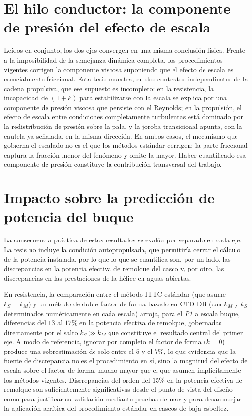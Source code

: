 \section{El hilo conductor: la componente de presión del efecto de escala}

Leídos en conjunto, los dos ejes convergen en una misma conclusión física. Frente a
la imposibilidad de la semejanza dinámica completa, los procedimientos vigentes
corrigen la componente viscosa suponiendo que el efecto de escala es esencialmente
friccional. Esta tesis muestra, en dos contextos independientes de la cadena
propulsiva, que ese supuesto es incompleto: en la resistencia, la incapacidad de
$(1+k)$ para estabilizarse con la escala se explica por una componente de presión
viscosa que persiste con el Reynolds; en la propulsión, el efecto de escala entre
condiciones completamente turbulentas está dominado por la redistribución de presión
sobre la pala, y la joroba transicional apunta, con la cautela ya señalada, en la
misma dirección. En ambos casos, el mecanismo que gobierna el escalado no es el que
los métodos estándar corrigen: la parte friccional captura la fracción menor del
fenómeno y omite la mayor. Haber cuantificado esa componente de presión constituye la
contribución transversal del trabajo.

\section{Impacto sobre la predicción de potencia del buque}

La consecuencia práctica de estos resultados se evalúa por separado en cada eje. La
tesis no incluye la condición autopropulsada, que permitiría cerrar el cálculo de la
potencia instalada, por lo que lo que se cuantifica son, por un lado, las
discrepancias en la potencia efectiva de remolque del casco y, por otro, las
discrepancias en las prestaciones de la hélice en aguas abiertas.

En resistencia, la comparación entre el método ITTC estándar (que asume $k_S = k_M$)
y un método de doble factor de forma basado en CFD DB (con $k_M$ y $k_S$
determinados numéricamente en cada escala) arroja, para el \textit{P1} a escala
buque, diferencias del $13$ al $17\%$ en la potencia efectiva de remolque,
gobernadas directamente por el salto $k_S \gg k_M$ que constituye el resultado
central del primer eje. A modo de referencia, ignorar por completo el factor de
forma ($k = 0$) produce una sobrestimación de solo entre el $5$ y el $7\%$, lo que
evidencia que la fuente de discrepancia no es el procedimiento en sí, sino la
magnitud del efecto de escala sobre el factor de forma, mucho mayor que el que asumen
implícitamente los métodos vigentes. Discrepancias del orden del $15\%$ en la
potencia efectiva de remolque son suficientemente significativas desde el punto de
vista del diseño como para justificar su validación mediante pruebas de mar y para
desaconsejar la aplicación acrítica del procedimiento estándar en cascos de baja
esbeltez.


